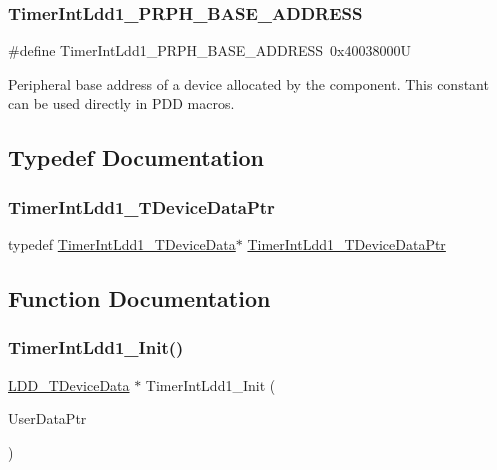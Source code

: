 \subsubsection{\texorpdfstring{Timer\+Int\+Ldd1\+\_\+\+P\+R\+P\+H\+\_\+\+B\+A\+S\+E\+\_\+\+A\+D\+D\+R\+E\+SS}{TimerIntLdd1\_PRPH\_BASE\_ADDRESS}}
{\footnotesize\ttfamily \#define Timer\+Int\+Ldd1\+\_\+\+P\+R\+P\+H\+\_\+\+B\+A\+S\+E\+\_\+\+A\+D\+D\+R\+E\+SS~0x40038000U}

Peripheral base address of a device allocated by the component. This constant can be used directly in P\+DD macros. 

\subsection{Typedef Documentation}
\mbox{\label{group___timer_int_ldd1__module_ga24d5bad052ceefb0ed97378c80c8dc03}} 
\subsubsection{\texorpdfstring{Timer\+Int\+Ldd1\+\_\+\+T\+Device\+Data\+Ptr}{TimerIntLdd1\_TDeviceDataPtr}}
{\footnotesize\ttfamily typedef \hyperlink{struct_timer_int_ldd1___t_device_data}{Timer\+Int\+Ldd1\+\_\+\+T\+Device\+Data}$\ast$ \hyperlink{group___timer_int_ldd1__module_ga24d5bad052ceefb0ed97378c80c8dc03}{Timer\+Int\+Ldd1\+\_\+\+T\+Device\+Data\+Ptr}}



\subsection{Function Documentation}
\mbox{\label{group___timer_int_ldd1__module_ga069f7459fc74e21fb9bcceadbe7cb9cb}} 
\subsubsection{\texorpdfstring{Timer\+Int\+Ldd1\+\_\+\+Init()}{TimerIntLdd1\_Init()}}
{\footnotesize\ttfamily \hyperlink{group___p_e___types__module_gac5cf1362f1f0e3a2ce71b1bf2276d091}{L\+D\+D\+\_\+\+T\+Device\+Data} $\ast$ Timer\+Int\+Ldd1\+\_\+\+Init (\begin{DoxyParamCaption}\item[{\hyperlink{group___p_e___types__module_ga0b66a73f87238a782318aa0be7578e35}{L\+D\+D\+\_\+\+T\+User\+Data} $\ast$}]{User\+Data\+Ptr }\end{DoxyParamCaption})}



